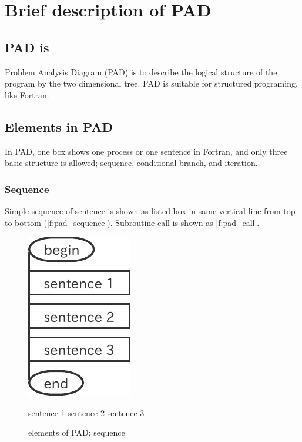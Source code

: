 \chapter{Brief description of PAD}\label{s:pad}

\section{PAD is }

Problem Analysis Diagram (PAD) is to describe the logical structure of
the program by the two dimensional tree.
%
PAD is suitable for structured programing, like Fortran.




\section{Elements in PAD}

In PAD, one box shows one process or one sentence in Fortran, and
only three basic structure is allowed; sequence, conditional branch, and iteration.

\subsection{Sequence}

%
Simple sequence of sentence is shown as listed box in same vertical line
from top to bottom
(\autoref{f:pad_sequence}).
%
Subroutine call is shown as \autoref{f:pad_call}.


\begin{figure}[htbp]
\begin{minipage}{.49\textwidth}
\center
 \includegraphics[scale=0.7]{figs/pad_sequence.pdf}
\end{minipage}
\begin{minipage}{.49\textwidth}
\begin{LstF90}[numbers=none]
 sentence 1
 sentence 2
 sentence 3
\end{LstF90}
\end{minipage}
\caption{elements of PAD: sequence}
\label{f:pad_sequence}
\end{figure}


